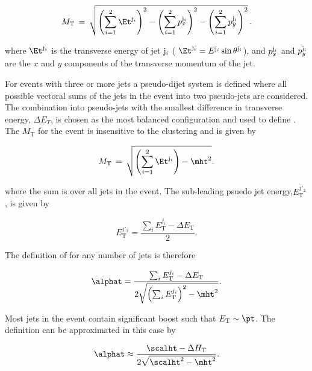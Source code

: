 \begin{equation}
  \label{eq:mt}
  M_\text{T}\, = \,\sqrt{ \left( \sum_{i=1}^2 \Et^{{\rm j}_i}
    \right)^2 - \left( \sum_{i=1}^2 p_x^{{\rm j}_i} \right)^2 - \left(
      \sum_{i=1}^2 p_y^{{\rm j}_i} \right)^2} \, .
\end{equation}

where $\Et^{{\rm j}_i}$ is the transverse energy of jet ${\rm j}_i$ (
$\Et^{{\rm j}_i} = E^{{\rm j}_i}\sin\theta^{{\rm j}_i}$), and
$p_x^{{\rm j}_i}$ and $p_y^{{\rm j}_i}$ are the $x$ and $y$ components
of the transverse momentum of the jet. 

For events with three or more jets a pseudo-dijet system is defined 
where all possible vectoral sums of the jets in the event into two
pseudo-jets are considered. The combination into pseudo-jets 
with the smallest difference in transverse energy, $\Delta E_T$, is chosen
as the most balanced configuration and used to define \alphat. The $M_\text{T}$ for the event is insensitive
to the clustering and is given by

\begin{equation}
  \label{eq:mt}
  M_\text{T}\, = \,\sqrt{ \left( \sum_{i=1}^2 \Et^{{\rm{j}}_i}
    \right) - \mht^2}.
\end{equation}

where the sum is over all jets in the event. The sub-leading psuedo jet energy,$E_{\textrm{T}}^{j'_2}$, 
is given by

\begin{equation}
E_{\textrm{T}}^{j'_2} = \frac{\sum_{i} E_{\textrm{T}}^{j_i} - \Delta E_{\textrm{T}}}{2}.
\end{equation}

The definition of \alphat for any number of jets is therefore

\begin{equation}
  \label{eq:alphat2}
   \alphat = \frac{\sum_{i} E_{\textrm{T}}^{j_i} - \Delta E_{\textrm{T}}}{2\sqrt{\left(\sum_{i} E_{\textrm{T}}^{j_i}\right)^2 - \mht^2}}.
\end{equation}

Most jets in the event contain significant boost such that $E_{\textrm{T}} \sim \pt$. The \alphat 
definition can be approximated in this case by

\begin{equation}
  \label{eq:alphat3}
   \alphat \approx \frac{\scalht - \Delta H_{\textrm{T}}}{2\sqrt{\scalht^2 - \mht^2}}.
\end{equation}

